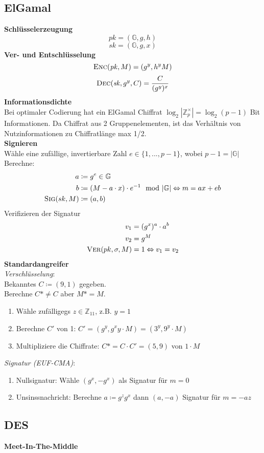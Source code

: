 \subsection{ElGamal}%
\label{av:sub:elgamal}
\textbf{Schlüsselerzeugung}
\[\mathit{pk} = (\mathbb{G},g,h)\]
\[\mathit{sk} = (\mathbb{G},g,x)\]
\textbf{Ver- und Entschlüsselung}
\[\textsc{Enc}(\mathit{pk}, M) = (g^y, h^yM)\]
\[\textsc{Dec}(\mathit{sk}, g^y, C) = \frac{C}{(g^y)^x}\]
\textbf{Informationsdichte}\\
Bei optimaler Codierung hat ein ElGamal Chiffrat \(\log_2 | \mathbb{Z}_p^{\times}| = \log_2(p-1)\)
Bit Informationen. Da Chiffrat aus 2 Gruppenelementen, ist das Verhältnis von Nutzinformationen zu Chiffratlänge max 1/2. \\
\textbf{Signieren}\\
Wähle eine zufällige, invertierbare Zahl \(e \in \{1,..., p-1\}\), wobei \(p - 1 = |\mathbb{G}|\)
Berechne:
\begin{align*}
  a &\coloneqq g^e \in \mathbb{G} \\
  b &\coloneqq (M - a \cdot x) \cdot e^{-1} \mod |\mathbb{G}| \Leftrightarrow m = ax + eb\\
  \textsc{Sig}(sk, M) &\coloneqq (a,b)
\end{align*}
Verifizieren der Signatur
\begin{align*}
  v_1 &= (g^x)^a \cdot a^b\\
  v_2 &= g^M\\
  \textsc{Ver}(pk,\sigma, M) &= 1 \Leftrightarrow v_1 = v_2
\end{align*}
\newpage
\noindent\textbf{Standardangreifer}\\
\textit{Verschlüsselung}:\\
Bekanntes \(C \coloneqq (9,1)\) gegeben.\\
Berechne \(C* \neq C\) aber \(M* = M\).
\begin{enumerate}
\item Wähle zufälligegs \(z \in \mathbb{Z}_{11}\), z.B. \(y=1\)
\item Berechne \(C'\) von 1: \(C' = (g^y, g^xy \cdot M) = (3^y, 9^y \cdot M)\)
\item Multipliziere die Chiffrate: \(C* = C \cdot C' = (5,9)\) von \(1 \cdot M\)
\end{enumerate}
\textit{Signatur (EUF-CMA)}:
\begin{enumerate}
\item Nullsignatur: Wähle \((g^x, -g^x)\) als Signatur für \(m=0\)
  \item Unsinssnachricht: Berechne \(a \coloneqq g^zg^x\) dann \((a, -a)\) Signatur für \(m=-az\)
\end{enumerate}

\subsection{DES}%
\label{av:sub:des}
\textbf{Meet-In-The-Middle}
